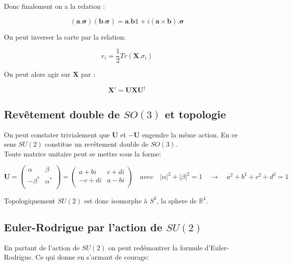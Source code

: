 \documentclass[12pt,a4paper]{article}
\newcommand{\unit}
{
\bm{\mathds{1}}
}
\begin{document}
Donc finalement on a la relation :

\[
 \boxed{ (\bm{a}.\bm{\sigma}) (\bm{b}.\bm{\sigma}) = \bm{a}.\bm{b} \unit + i(\bm{a}\times\bm{b}).\bm{\sigma}}
\]

On peut inverser la carte par la relation:

\[
\boxed{r_i= \frac{1}{2} Tr(\bm{X}.\sigma_i)}
\]

On peut alors agir sur $\bm{X}$ par :

\[
	\boxed{ \bm{X}'=\bm{U} \bm{X} \bm{U}^{\dagger} }
\]

\subsection{Revêtement double de $SO(3)$ et topologie}
\label{l_topo_su2}

On peut constater trivialement que $\bm{U}$ et $-\bm{U}$ engendre la même action.
En ce sens $SU(2)$ constitue un revêtement double de $SO(3)$.\\

Toute matrice unitaire peut se mettre sous la forme:

\[
\bm{U}=
\begin{pmatrix}
\alpha & \beta\\
-\beta^* & \alpha^*\\
\end{pmatrix}
=
\begin{pmatrix}
a+b i & c+d i\\
-c+d i & a-b i\\
\end{pmatrix}
\quad 
avec 
\quad 
|\alpha|^2+|\beta|^2=1 \quad \rightarrow \quad a^2+b^2+c^2+d^2=1
\]

Topologiquement $SU(2)$ est donc isomorphe à $S^3$, la sphere de $\mathbb{R}^4$. 


\newpage
\subsection{Euler-Rodrigue par l'action de $SU(2)$}

En partant de l'action de $SU(2)$ on peut redémontrer la formule d'Euler-Rodrigue. Ce qui donne en s'armant de courage:
\end{document}
